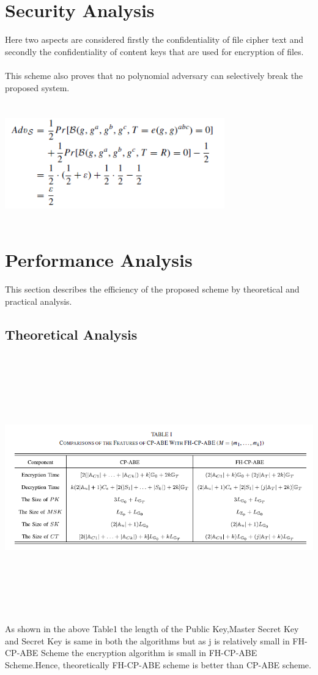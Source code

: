 \documentclass[a4paper,12pt]{article}
\begin{document}
\section{Security Analysis}
Here two aspects are considered firstly the confidentiality of file cipher text and secondly the confidentiality of content keys that are used for encryption of files.\\ \\
This scheme also proves that no polynomial adversary can selectively break the proposed system.\\ \\
\includegraphics[width=9.5cm,height=5cm]{fig15.PNG}
\newpage
\section{Performance Analysis}
This section describes the efficiency of the proposed scheme by theoretical and practical analysis.\\
\subsection{Theoretical Analysis}
\includegraphics[width=18.5cm,height=11.5cm]{fig16.PNG}
As shown in the above Table1 the length of the Public Key,Master Secret Key and Secret Key is same in both the algorithms but as j is relatively small in FH-CP-ABE Scheme the encryption algorithm is small in FH-CP-ABE Scheme.Hence, theoretically FH-CP-ABE scheme is better than CP-ABE scheme.\\ \\ \\
\end{document}

